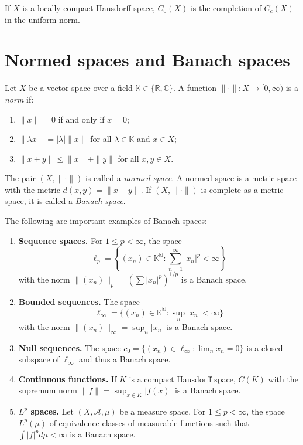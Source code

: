\begin{proposition}
\label{proposition-c0-completion-cc}
If $X$ is a locally compact Hausdorff space,
$C_0(X)$ is the completion of $C_c(X)$ in the
uniform norm.
\end{proposition}

\section{Normed spaces and Banach spaces}
\label{section-normed-banach-spaces}

\begin{definition}
\label{definition-norm}
Let $X$ be a vector space over a field
$\mathbb{K} \in \{\mathbb{R}, \mathbb{C}\}$.
A function $\|\cdot\|: X \to [0, \infty)$ is
a {\it norm} if:
\begin{enumerate}
\item $\|x\| = 0$ if and only if $x = 0$;
\item $\|\lambda x\| = |\lambda|\|x\|$ for
all $\lambda \in \mathbb{K}$ and $x \in X$;
\item $\|x+y\| \leq \|x\| + \|y\|$ for all
$x, y \in X$.
\end{enumerate}
The pair $(X, \|\cdot\|)$ is called a {\it
normed space}. A normed space is a metric
space with the metric $d(x,y) = \|x-y\|$. If
$(X, \|\cdot\|)$ is complete as a metric
space, it is called a {\it Banach space}.
\end{definition}

\begin{example}
\label{example-banach-spaces}
The following are important examples of
Banach spaces:
\begin{enumerate}
\item {\bf Sequence spaces.} For $1 \leq p <
\infty$, the space
$$
\ell_p = \left\{ (x_n) \in
\mathbb{K}^\mathbb{N} : \sum_{n=1}^\infty
|x_n|^p < \infty \right\}
$$
with the norm $\|(x_n)\|_p = (\sum
|x_n|^p)^{1/p}$ is a Banach space.
\item {\bf Bounded sequences.} The space
$$
\ell_\infty = \{ (x_n) \in
\mathbb{K}^\mathbb{N} : \sup_n |x_n| < \infty
\}
$$
with the norm $\|(x_n)\|_\infty = \sup_n
|x_n|$ is a Banach space.
\item {\bf Null sequences.} The space $c_0 =
\{ (x_n) \in \ell_\infty : \lim_n x_n = 0 \}$
is a closed subspace of $\ell_\infty$ and
thus a Banach space.
\item {\bf Continuous functions.} If $K$ is a
compact Hausdorff space, $C(K)$ with the
supremum norm $\|f\| = \sup_{x \in K} |f(x)|$
is a Banach space.
\item {\bf $L^p$ spaces.} Let $(X,
\mathcal{A}, \mu)$ be a measure space. For $1
\leq p < \infty$, the space $L^p(\mu)$ of
equivalence classes of measurable functions
such that $\int |f|^p d\mu < \infty$ is a
Banach space.
\end{enumerate}
\end{example}

